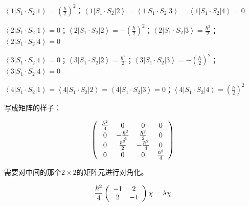 $\left\langle 1 \right|S_1  \cdot S_2 \left| 1 \right\rangle  =
\left( {\frac{\hbar }{2}} \right)^2$；$\left\langle 1 \right|S_1
\cdot S_2 \left| 2 \right\rangle  = \left\langle 1 \right|S_1  \cdot
S_2 \left| 3 \right\rangle  = \left\langle 1 \right|S_1  \cdot S_2
\left| 4 \right\rangle  = 0$

$\left\langle 2 \right|S_1  \cdot S_2 \left| 1 \right\rangle  =
0$；$\left\langle 2 \right|S_1  \cdot S_2 \left| 2 \right\rangle  =
- \left( {\frac{\hbar }{2}} \right)^2$；$\left\langle 2 \right|S_1
\cdot S_2 \left| 3 \right\rangle  = \frac{{\hbar ^2
}}{2}$；$\left\langle 2 \right|S_1  \cdot S_2 \left| 4 \right\rangle
= 0$

$\left\langle 3 \right|S_1  \cdot S_2 \left| 1 \right\rangle  =
0$；$\left\langle 3 \right|S_1  \cdot S_2 \left| 2 \right\rangle  =
\frac{{\hbar ^2 }}{2}$；$\left\langle 3 \right|S_1  \cdot S_2 \left|
3 \right\rangle  =  - \left( {\frac{\hbar }{2}}
\right)^2$；$\left\langle 3 \right|S_1  \cdot S_2 \left| 4
\right\rangle  = 0$

$\left\langle 4 \right|S_1  \cdot S_2 \left| 1 \right\rangle  =
\left\langle 4 \right|S_1  \cdot S_2 \left| 2 \right\rangle  =
\left\langle 4 \right|S_1  \cdot S_2 \left| 3 \right\rangle  =
0$；$\left\langle 4 \right|S_1  \cdot S_2 \left| 4 \right\rangle  =
\left( {\frac{\hbar }{2}} \right)^2$



写成矩阵的样子：


\begin{equation*}
  \left( {\begin{array}{*{20}c}
   {\frac{{\hbar ^2 }}{4}} & 0 & 0 & 0  \\
   0 & { - \frac{{\hbar ^2 }}{4}} & {\frac{{\hbar ^2 }}{2}} & 0  \\
   0 & {\frac{{\hbar ^2 }}{2}} & { - \frac{{\hbar ^2 }}{4}} & 0  \\
   0 & 0 & 0 & {\frac{{\hbar ^2 }}{4}}  \\
\end{array}} \right)
\end{equation*}


需要对中间的那个$2 \times 2$的矩阵元进行对角化。


\begin{equation*}
    \frac{{\hbar ^2 }}{4}\left( {\begin{array}{*{20}c}
   { - 1} & 2  \\
   2 & { - 1}  \\
\end{array}} \right)\chi  = \lambda \chi
\end{equation*}

